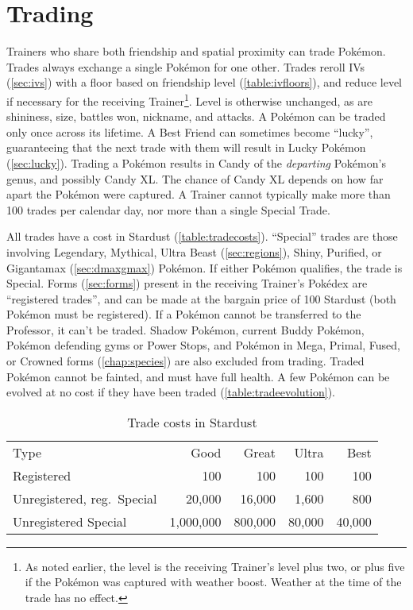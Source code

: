 \section{Trading\label{sec:trades}}
Trainers who share both friendship and spatial proximity can trade Pokémon.
Trades always exchange a single Pokémon for one other.
Trades reroll IVs (\autoref{sec:ivs}) with a floor based on friendship level (\autoref{table:ivfloors}),
  and reduce level if necessary for the receiving Trainer\footnote{As noted earlier, the level is
  the receiving Trainer's level plus two, or plus five if the Pokémon was captured with weather boost.
  Weather at the time of the trade has no effect.}.
Level is otherwise unchanged, as are shininess, size, battles won, nickname, and attacks.
A Pokémon can be traded only once across its lifetime.
A Best Friend can sometimes become ``lucky'', guaranteeing that the next trade with
  them will result in Lucky Pokémon (\autoref{sec:lucky}).
Trading a Pokémon results in Candy of the \textit{departing} Pokémon's genus,
  and possibly Candy XL\@.
The chance of Candy XL depends on how far apart the Pokémon were captured.
A Trainer cannot typically make more than 100 trades per calendar day, nor more
 than a single Special Trade.

All trades have a cost in Stardust (\autoref{table:tradecosts}).
``Special'' trades are those involving Legendary, Mythical, Ultra Beast (\autoref{sec:regions}),
  Shiny, Purified, or Gigantamax (\autoref{sec:dmaxgmax}) Pokémon.
If either Pokémon qualifies, the trade is Special.
Forms (\autoref{sec:forms}) present in the receiving Trainer's Pokédex are
  ``registered trades'', and can be made at the bargain price of 100 Stardust
  (both Pokémon must be registered).
If a Pokémon cannot be transferred to the Professor, it can't be traded.
Shadow Pokémon, current Buddy Pokémon, Pokémon defending gyms or Power Stops, and Pokémon
 in Mega, Primal, Fused, or Crowned forms (\autoref{chap:species}) are also excluded from trading.
Traded Pokémon cannot be fainted, and must have full health.
A few Pokémon can be evolved at no cost if they have been traded (\autoref{table:tradeevolution}).
\begin{table}
\centering
\begin{tabular}{lrrrr}
Type & Good & Great & Ultra & Best\\
\Midrule
Registered & 100 & 100 & 100 & 100\\
Unregistered, reg.\ Special & 20,000 & 16,000 & 1,600 & 800\\
Unregistered Special & 1,000,000 & 800,000 & 80,000 & 40,000\\
\end{tabular}
\caption{Trade costs in Stardust\label{table:tradecosts}}
\end{table}

